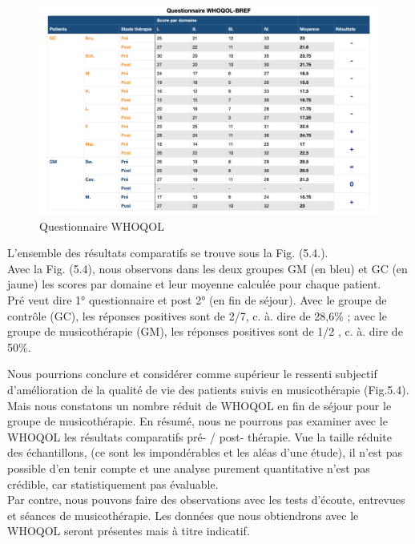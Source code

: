   
  \begin{figure}
  	\centering
  	\includegraphics[width=0.7\linewidth]{images/graphiques/questionnaire_wq.png}
  	\caption[Questionnaire WHOQOL-BREF]{Questionnaire WHOQOL}%
  	
  \end{figure}
  


  L'ensemble des résultats comparatifs se trouve sous la Fig. (5.4.).
   \\
  Avec la Fig. (5.4), nous observons dans les deux groupes GM (en bleu) et GC (en jaune) les scores par 
 domaine et leur moyenne calculée pour chaque 
 patient. 
  \\
 Pré veut dire 1° questionnaire et post 2° (en fin de séjour).
 Avec le groupe de contrôle (GC), les réponses 
 positives sont de  2/7, c. à. dire de  28,6\% ; avec 
 le groupe de musicothérapie (GM), les réponses positives sont de 1/2 , c. à. dire de 50\%.
 
 
 
 
 Nous pourrions conclure et considérer comme
  supérieur le ressenti
  subjectif d'amélioration de la qualité de vie 
  des patients suivis en musicothérapie (Fig.5.4).  Mais nous constatons un nombre réduit de WHOQOL 
  en fin de 
  séjour pour le groupe de musicothérapie. 
  En résumé, nous ne pourrons pas examiner avec  le WHOQOL %
  les résultats comparatifs  pré- / post- 
  thé\-ra\-pie. Vue la taille réduite des échantillons, (ce sont les 
  impondérables et les aléas d'une étude), il n'est pas possible d'en tenir compte et une analyse purement
  quantitative n'est pas crédible, car statistiquement pas évaluable. 
   \\
 Par contre, nous pouvons faire des observations avec les tests d'écoute, entrevues et séances de 
 musicothérapie. Les données que nous obtiendrons avec le WHOQOL seront présentes mais à titre 
 indicatif.
 \clearpage

